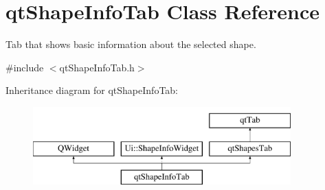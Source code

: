 \hypertarget{classqt_shape_info_tab}{}\section{qt\+Shape\+Info\+Tab Class Reference}
\label{classqt_shape_info_tab}


Tab that shows basic information about the selected shape.  




{\ttfamily \#include $<$qt\+Shape\+Info\+Tab.\+h$>$}

Inheritance diagram for qt\+Shape\+Info\+Tab\+:\begin{figure}[H]
\begin{center}
\leavevmode
\includegraphics[height=3.000000cm]{classqt_shape_info_tab}
\end{center}
\end{figure}
